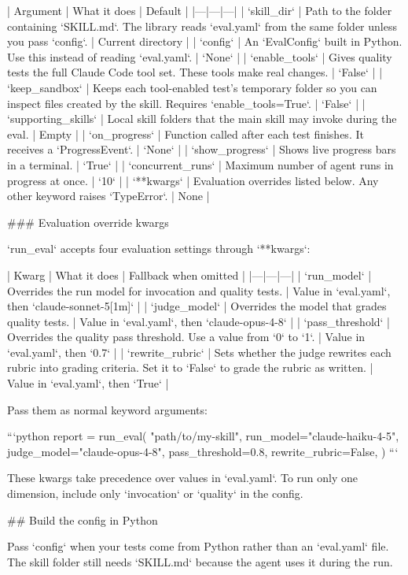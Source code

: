 | Argument | What it does | Default |
|---|---|---|
| `skill_dir` | Path to the folder containing `SKILL.md`. The library reads `eval.yaml` from the same folder unless you pass `config`. | Current directory |
| `config` | An `EvalConfig` built in Python. Use this instead of reading `eval.yaml`. | `None` |
| `enable_tools` | Gives quality tests the full Claude Code tool set. These tools make real changes. | `False` |
| `keep_sandbox` | Keeps each tool-enabled test's temporary folder so you can inspect files created by the skill. Requires `enable_tools=True`. | `False` |
| `supporting_skills` | Local skill folders that the main skill may invoke during the eval. | Empty |
| `on_progress` | Function called after each test finishes. It receives a `ProgressEvent`. | `None` |
| `show_progress` | Shows live progress bars in a terminal. | `True` |
| `concurrent_runs` | Maximum number of agent runs in progress at once. | `10` |
| `**kwargs` | Evaluation overrides listed below. Any other keyword raises `TypeError`. | None |

### Evaluation override kwargs

`run_eval` accepts four evaluation settings through `**kwargs`:

| Kwarg | What it does | Fallback when omitted |
|---|---|---|
| `run_model` | Overrides the run model for invocation and quality tests. | Value in `eval.yaml`, then `claude-sonnet-5[1m]` |
| `judge_model` | Overrides the model that grades quality tests. | Value in `eval.yaml`, then `claude-opus-4-8` |
| `pass_threshold` | Overrides the quality pass threshold. Use a value from `0` to `1`. | Value in `eval.yaml`, then `0.7` |
| `rewrite_rubric` | Sets whether the judge rewrites each rubric into grading criteria. Set it to `False` to grade the rubric as written. | Value in `eval.yaml`, then `True` |

Pass them as normal keyword arguments:

```python
report = run_eval(
    "path/to/my-skill",
    run_model="claude-haiku-4-5",
    judge_model="claude-opus-4-8",
    pass_threshold=0.8,
    rewrite_rubric=False,
)
```

These kwargs take precedence over values in `eval.yaml`.
To run only one dimension, include only `invocation` or `quality` in the config.

## Build the config in Python

Pass `config` when your tests come from Python rather than an `eval.yaml` file.
The skill folder still needs `SKILL.md` because the agent uses it during the run.

